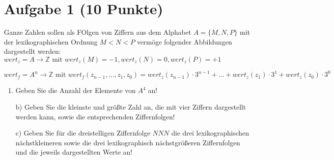 \section*{Aufgabe 1 (10 Punkte)}

Ganze Zahlen sollen als FOlgen von Ziffern aus dem Alphabet $A = \{M, N, P\}$ mit der lexikographischen Ordnung $M < N < P$ vermöge folgender Abbildungen dargestellt werden:\\

$wert_z = A \rightarrow \mathbb{Z} \text{ mit } wert_z(M) = -1, wert_z(N) = 0, wert_z(P) = +1$

$wert_f = A^n \rightarrow \mathbb{Z} \text{ mit } wert_f(z_{n-1}, \dots , z_1, z_0) = wert_z(z_{n-1}) \cdot 3^{n-1} + \dots + wert_z(z_1) \cdot 3^1 + wert_z(z_0) \cdot 3^0$

\begin{enumerate}[label={a)}, leftmargin=*]
\item Geben Sie die Anzahl der Elemente von $A^4$ an!
\item[b)] Geben Sie die kleinste und größte Zahl an, die mit vier Ziffern dargestellt werden kann, sowie die entsprechenden Ziffernfolgen!
\item[c)] Geben Sie für die dreistelligen Ziffernfolge $N N N$ die drei lexikographischen nächstkleineren sowie die drei lexikographisch nächstgrößeren Ziffernfolgen und die jeweils dargestellten Werte an!
\end{enumerate}